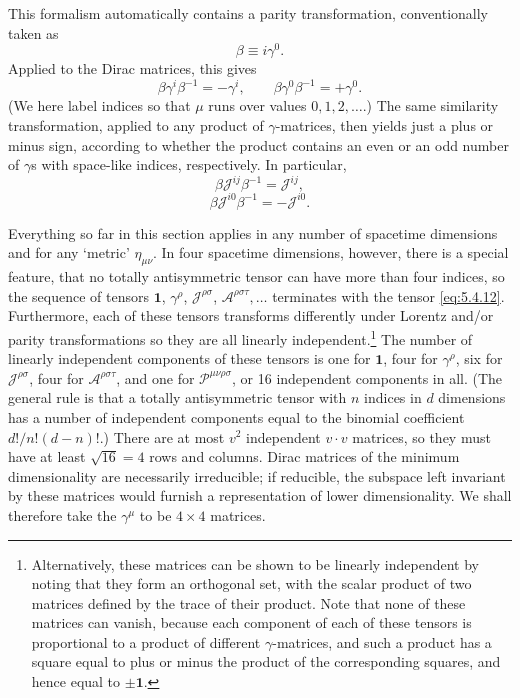 This formalism automatically contains a parity transformation, conventionally
taken as
\begin{equation}
\beta\equiv i\gamma^0.
\tag{5.4.13}\label{eq:5.4.13}
\end{equation}
Applied to the Dirac matrices, this gives
\begin{equation}
\beta\gamma^i\beta^{-1}=-\gamma^i,
\qquad
\beta\gamma^0\beta^{-1}=+\gamma^0.
\tag{5.4.14}\label{eq:5.4.14}
\end{equation}
(We here label indices so that $\mu$ runs over values $0,1,2,\ldots$.) The same
similarity transformation, applied to any product of $\gamma$-matrices, then
yields just a plus or minus sign, according to whether the product contains an
even or an odd number of $\gamma$s with space-like indices, respectively. In
particular,
\begin{equation}
\beta\mathcal{J}^{ij}\beta^{-1}=\mathcal{J}^{ij},
\tag{5.4.15}\label{eq:5.4.15}
\end{equation}
\begin{equation}
\beta\mathcal{J}^{i0}\beta^{-1}=-\mathcal{J}^{i0}.
\tag{5.4.16}\label{eq:5.4.16}
\end{equation}

Everything so far in this section applies in any number of spacetime
dimensions and for any `metric' $\eta_{\mu\nu}$. In four spacetime dimensions,
however, there is a special feature, that no totally antisymmetric tensor can
have more than four indices, so the sequence of tensors $\mathbf{1}$,
$\gamma^\rho$, $\mathcal{J}^{\rho\sigma}$,
$\mathcal{A}^{\rho\sigma\tau},\ldots$ terminates with the tensor \eqref{eq:5.4.12}.
Furthermore, each of these tensors transforms differently under Lorentz and/or
parity transformations so they are all linearly independent.\footnote{Alternatively,
these matrices can be shown to be linearly independent by noting that they
form an orthogonal set, with the scalar product of two matrices defined by the
trace of their product. Note that none of these matrices can vanish, because
each component of each of these tensors is proportional to a product of
different $\gamma$-matrices, and such a product has a square equal to plus or
minus the product of the corresponding squares, and hence equal to
$\mathbin{\pm}\mathbf{1}$.} The number of linearly independent components of
these tensors is one for $\mathbf{1}$, four for $\gamma^\rho$, six for
$\mathcal{J}^{\rho\sigma}$, four for $\mathcal{A}^{\rho\sigma\tau}$, and one
for $\mathcal{P}^{\mu\nu\rho\sigma}$, or 16 independent components in all.
(The general rule is that a totally antisymmetric tensor with $n$ indices in
$d$ dimensions has a number of independent components equal to the binomial
coefficient $d!/n!(d-n)!$.) There are at most $v^2$ independent $v\cdot v$
matrices, so they must have at least $\sqrt{16}=4$ rows and columns. Dirac
matrices of the minimum dimensionality are necessarily irreducible; if
reducible, the subspace left invariant by these matrices would furnish a
representation of lower dimensionality. We shall therefore take the
$\gamma^\mu$ to be $4\times4$ matrices.

